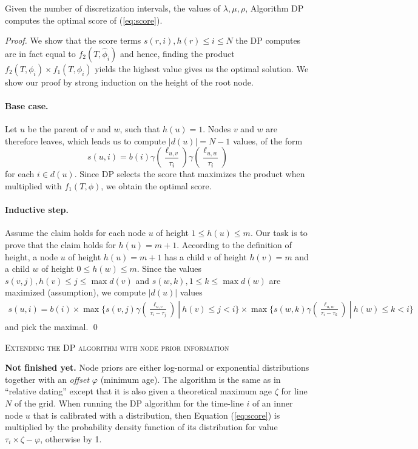\documentclass{llncs}
\renewcommand{\section}[1]{%
\bigskip
\begin{center}
\begin{Large}
\normalfont\scshape #1
\medskip
\end{Large}
\end{center}}
\begin{document}
\begin{theorem}[Optimality of DP]
Given the number of discretization intervals, the values of $\lambda,\mu,\rho$,
Algorithm DP computes the optimal score of (\ref{eq:score}).
\end{theorem}
\begin{proof}
We show that the score terms $s(r,i), h(r) \leq i \leq N$ the DP computes are
in fact equal to $f_2(T,\hat\phi_i)$ and hence, finding the product
$f_2(T,\phi_i)\times f_1(T,\phi_i)$ yields the highest value gives us the
optimal solution. We show our proof by strong induction on the height of the
root node.
\paragraph{Base case.} Let $u$ be the parent of $v$ and $w$, such that $h(u) =
1$. Nodes $v$ and $w$ are therefore leaves, which leads us to compute
$|d(u)|=N-1$ values, of the form
%
%
$$
s(u,i) = b(i)
         \gamma(\frac{\ell_{u,v}}{\tau_i})
         \gamma(\frac{\ell_{u,w}}{\tau_i})
$$
%
%
for each $i \in d(u)$. Since DP selects the score that maximizes the product
when multiplied with $f_1(T,\phi)$, we obtain the optimal score.
\paragraph{Inductive step.} Assume the claim holds for each node $u$ of height
$1 \leq h(u) \leq m$. Our task is to prove that the claim holds for $h(u) =
m+1$.  According to the definition of height, a node $u$ of height $h(u)=m+1$
has a child $v$ of height $h(v)=m$ and a child $w$ of height $0 \leq h(w) \leq
m$.  Since the values $s(v,j), h(v) \leq j \leq \max d(v)$ and $s(w,k), 1 \leq
k \leq \max d(w)$ are maximized (assumption), we compute $|d(u)|$ values
%
%
\begin{equation*}
\begin{split}
s(u,i) =  b(i)\times 
          \max\{ s(v,j)\gamma(\frac{\ell_{u,v}}{\tau_i-\tau_j})\ |\
              h(v) \leq j < i\} \times 
          \max\{ s(w,k)\gamma(\frac{\ell_{u,w}}{\tau_i-\tau_k})\ |\ 
               h(w) \leq k < i\}
\end{split}
\end{equation*}
%
%
and pick the maximal.
\qed\end{proof}

\section{Extending the DP algorithm with node prior information}
\textbf{Not finished yet.} Node priors are either log-normal or exponential
distributions together with an {\em offset} $\varphi$ (minimum age).  The
algorithm is the same as in ``relative dating'' except that it is also given a
theoretical maximum age $\zeta$ for line $N$ of the grid.  When running the DP
algorithm for the time-line $i$ of an inner node $u$ that is calibrated with a
distribution, then Equation (\ref{eq:score}) is multiplied by the probability
density function of its distribution for value $\tau_i \times \zeta - \varphi$,
otherwise by 1.
\end{document}
